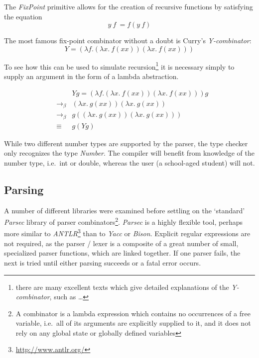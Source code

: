 \documentclass[12pt, a4paper]{report}
\begin{document}
The \textit{FixPoint} primitive allows for the creation of recursive functions by satisfying the equation
\begin{displaymath}
    y\ f\ = f (y\ f)
\end{displaymath}

The most famous fix-point combinator without a doubt is Curry's \textit{Y-combinator}:
\begin{displaymath}
    Y = (\lambda f. (\lambda x.\ f (x x)) (\lambda x.\ f (x x)))
\end{displaymath}

To see how this can be used to simulate recursion\footnote{there are many excellent texts which
    give detailed explanations of the \textit{Y-combinator}, such as \dots } it is necessary simply
to supply an argument in the form of a lambda abstraction.

\begin{figure}
    \centering
    \begin{eqnarray*}
        && Y g = (\lambda f. (\lambda x.\ f (x x)) (\lambda x.\ f (x x))) g \\
        & \to_\beta & (\lambda x.\ g (x x)) (\lambda x.\ g (x x)) \\
        & \to_\beta & g ((\lambda x.\ g (x x)) (\lambda x.\ g (x x))) \\
        & \equiv & g (Y g)
    \end{eqnarray*}
\end{figure}

While two different number types are supported by the parser, the type checker only recognizes the
type \textit{Number}. The compiler will benefit from knowledge of the number type, i.e.\ int or double,
whereas the user (a school-aged student) will not.

\subsection{Parsing}
A number of different libraries were examined before settling on the `standard'
\textit{Parsec} library of parser combinators\footnote{A combinator is a lambda expression which
    contains no occurrences of a free variable, i.e.\ all of its arguments are
    explicitly supplied to it, and it does not rely on any global state or globally defined
    variables}. \textit{Parsec} is a highly
flexible tool, perhaps more similar to \textit{ANTLR}\footnote{\url{http://www.antlr.org/}} than to
\textit{Yacc} or \textit{Bison}. Explicit regular expressions are not required, as the parser /
lexer is a composite of a great number of small, specialized parser functions, which are linked
together. If one parser fails, the next is tried until either parsing succeeds or a fatal error
occurs. 
\end{document}
